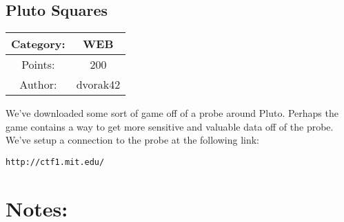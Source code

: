 \begin{center}
\section*{Pluto Squares}
{\large
\begin{tabular}{| c c |}
\hline
Category: & WEB\\\hline
Points: & 200\\\hline
Author: & dvorak42\\\hline
\end{tabular}
}
\end{center}
\vspace{0.5in}

{\large
We've downloaded some sort of game off of a probe around Pluto. Perhaps the game contains a way to get more sensitive and valuable data off of the probe. We've setup a connection to the probe at the following link:
}
\vspace{0.25in}
\begin{center}
  {\Large\tt http://ctf1.mit.edu/}
\end{center}

\vspace{0.25in}
\section*{Notes:}
